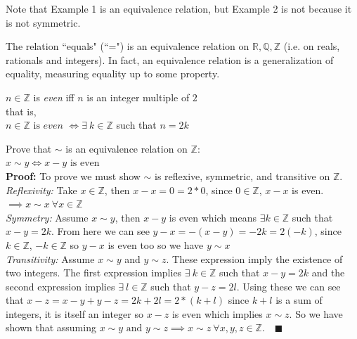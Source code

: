 Note that Example 1 is an equivalence relation, but Example 2 is not because it is not symmetric.
\newpage
\begin{example}
The relation ``equals" (``=") is an equivalence relation on $\mathbb{R}, \mathbb{Q}, \mathbb{Z}$ (i.e. on reals, rationals and integers). In fact, an equivalence relation is a generalization of equality, measuring equality up to some property.
\end{example}
\begin{definition}[Even]
$n\in \mathbb{Z}$ is \textit{even} iff $n$ is an integer multiple of $2$ \\
that is, \\
$n\in \mathbb{Z} \text{ is}\textit{ even }\Leftrightarrow \exists \ k \in \mathbb{Z}$ such that $n=2k$
\end{definition}

\begin{example}
Prove that $\sim$ is an equivalence relation on $\mathbb{Z}$:\\
$x\sim y \iff x-y \text{ is even}$\steezybreak\\

\noindent\textbf{Proof:} To prove we must show $\sim$ is reflexive, symmetric, and transitive on $\mathbb{Z}$.\\
\textit{Reflexivity:} Take $x\in \mathbb{Z}$, then $x-x=0=2*0$, since $0\in \mathbb{Z}$, $x-x$ is even. $\implies x\sim x \ \forall x \in \mathbb{Z}$\\
\textit{Symmetry:} Assume $x\sim y$, then $x-y$ is even which means $\exists k \in \mathbb{Z}$ such that $x-y=2k$. From here we can see $y-x=-(x-y)=-2k=2(-k)$, since $k\in \mathbb{Z}$, $-k\in \mathbb{Z}$ so $y-x$ is even too so we have $y\sim x$\\
\textit{Transitivity:} Assume $x\sim y$ and $y \sim z$. These expression imply the existence of two integers. The first expression implies $\exists \ k\in \mathbb{Z}$ such that $x-y=2k$ and the second expression implies $\exists \ l \in \mathbb{Z}$ such that $y-z=2l$. Using these we can see that $x-z=x-y+y-z=2k+2l=2*(k+l)$ since $k+l$ is a sum of integers, it is itself an integer so $x-z$ is even which implies $x\sim z$. So we have shown that assuming $x\sim y \text{ and } y\sim z \implies x\sim z \ \forall x,y,z \in \mathbb{Z}$. $\ \ \ \blacksquare$
\end{example}
